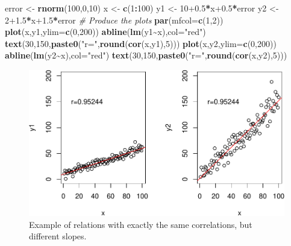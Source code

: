 \documentclass[
]{book}
\newenvironment{Shaded}{\begin{snugshade}}{\end{snugshade}}
\newcommand{\AttributeTok}[1]{\textcolor[rgb]{0.13,0.29,0.53}{#1}}
\newcommand{\CommentTok}[1]{\textcolor[rgb]{0.56,0.35,0.01}{\textit{#1}}}
\newcommand{\DecValTok}[1]{\textcolor[rgb]{0.00,0.00,0.81}{#1}}
\newcommand{\FloatTok}[1]{\textcolor[rgb]{0.00,0.00,0.81}{#1}}
\newcommand{\FunctionTok}[1]{\textcolor[rgb]{0.13,0.29,0.53}{\textbf{#1}}}
\newcommand{\NormalTok}[1]{#1}
\newcommand{\OtherTok}[1]{\textcolor[rgb]{0.56,0.35,0.01}{#1}}
\newcommand{\SpecialCharTok}[1]{\textcolor[rgb]{0.81,0.36,0.00}{\textbf{#1}}}
\newcommand{\StringTok}[1]{\textcolor[rgb]{0.31,0.60,0.02}{#1}}
\theoremstyle{definition}
\theoremstyle{definition}
\theoremstyle{definition}
\theoremstyle{definition}
\theoremstyle{remark}
\begin{document}
\begin{Shaded}
\begin{Highlighting}[]
\NormalTok{error }\OtherTok{\textless{}{-}} \FunctionTok{rnorm}\NormalTok{(}\DecValTok{100}\NormalTok{,}\DecValTok{0}\NormalTok{,}\DecValTok{10}\NormalTok{)}
\NormalTok{x }\OtherTok{\textless{}{-}} \FunctionTok{c}\NormalTok{(}\DecValTok{1}\SpecialCharTok{:}\DecValTok{100}\NormalTok{)}
\NormalTok{y1 }\OtherTok{\textless{}{-}} \DecValTok{10}\FloatTok{+0.5}\SpecialCharTok{*}\NormalTok{x}\FloatTok{+0.5}\SpecialCharTok{*}\NormalTok{error}
\NormalTok{y2 }\OtherTok{\textless{}{-}} \DecValTok{2}\FloatTok{+1.5}\SpecialCharTok{*}\NormalTok{x}\FloatTok{+1.5}\SpecialCharTok{*}\NormalTok{error}
\CommentTok{\# Produce the plots}
\FunctionTok{par}\NormalTok{(}\AttributeTok{mfcol=}\FunctionTok{c}\NormalTok{(}\DecValTok{1}\NormalTok{,}\DecValTok{2}\NormalTok{))}
\FunctionTok{plot}\NormalTok{(x,y1,}\AttributeTok{ylim=}\FunctionTok{c}\NormalTok{(}\DecValTok{0}\NormalTok{,}\DecValTok{200}\NormalTok{))}
\FunctionTok{abline}\NormalTok{(}\FunctionTok{lm}\NormalTok{(y1}\SpecialCharTok{\textasciitilde{}}\NormalTok{x),}\AttributeTok{col=}\StringTok{"red"}\NormalTok{)}
\FunctionTok{text}\NormalTok{(}\DecValTok{30}\NormalTok{,}\DecValTok{150}\NormalTok{,}\FunctionTok{paste0}\NormalTok{(}\StringTok{"r="}\NormalTok{,}\FunctionTok{round}\NormalTok{(}\FunctionTok{cor}\NormalTok{(x,y1),}\DecValTok{5}\NormalTok{)))}
\FunctionTok{plot}\NormalTok{(x,y2,}\AttributeTok{ylim=}\FunctionTok{c}\NormalTok{(}\DecValTok{0}\NormalTok{,}\DecValTok{200}\NormalTok{))}
\FunctionTok{abline}\NormalTok{(}\FunctionTok{lm}\NormalTok{(y2}\SpecialCharTok{\textasciitilde{}}\NormalTok{x),}\AttributeTok{col=}\StringTok{"red"}\NormalTok{)}
\FunctionTok{text}\NormalTok{(}\DecValTok{30}\NormalTok{,}\DecValTok{150}\NormalTok{,}\FunctionTok{paste0}\NormalTok{(}\StringTok{"r="}\NormalTok{,}\FunctionTok{round}\NormalTok{(}\FunctionTok{cor}\NormalTok{(x,y2),}\DecValTok{5}\NormalTok{)))}
\end{Highlighting}
\end{Shaded}

\begin{figure}
\centering
\includegraphics{Svetunkov---Statistics-for-Business-Analytics_files/figure-latex/correlationsScatterplotExample-1.pdf}
\caption{\label{fig:correlationsScatterplotExample}Example of relations with exactly the same correlations, but different slopes.}
\end{figure}
\end{document}
